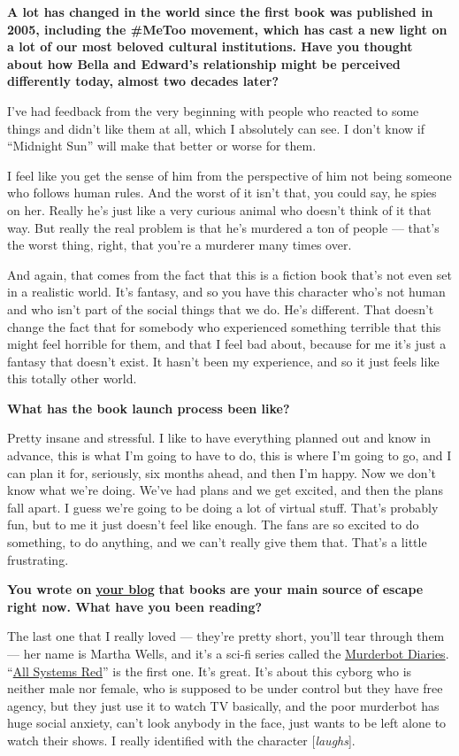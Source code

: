 \textbf{A lot has changed in the world since the first book was
published in 2005, including the \#MeToo movement, which has cast a new
light on a lot of our most beloved cultural institutions. Have you
thought about how Bella and Edward's relationship might be perceived
differently today, almost two decades later?}

I've had feedback from the very beginning with people who reacted to
some things and didn't like them at all, which I absolutely can see. I
don't know if ``Midnight Sun'' will make that better or worse for them.

I feel like you get the sense of him from the perspective of him not
being someone who follows human rules. And the worst of it isn't that,
you could say, he spies on her. Really he's just like a very curious
animal who doesn't think of it that way. But really the real problem is
that he's murdered a ton of people --- that's the worst thing, right,
that you're a murderer many times over.

And again, that comes from the fact that this is a fiction book that's
not even set in a realistic world. It's fantasy, and so you have this
character who's not human and who isn't part of the social things that
we do. He's different. That doesn't change the fact that for somebody
who experienced something terrible that this might feel horrible for
them, and that I feel bad about, because for me it's just a fantasy that
doesn't exist. It hasn't been my experience, and so it just feels like
this totally other world.

\textbf{What has the book launch process been like?}

Pretty insane and stressful. I like to have everything planned out and
know in advance, this is what I'm going to have to do, this is where I'm
going to go, and I can plan it for, seriously, six months ahead, and
then I'm happy. Now we don't know what we're doing. We've had plans and
we get excited, and then the plans fall apart. I guess we're going to be
doing a lot of virtual stuff. That's probably fun, but to me it just
doesn't feel like enough. The fans are so excited to do something, to do
anything, and we can't really give them that. That's a little
frustrating.

\textbf{You wrote on}
\textbf{\href{https://stepheniemeyer.com/updates}{your blog}}
\textbf{that books are your main source of escape right now. What have
you been reading?}

The last one that I really loved --- they're pretty short, you'll tear
through them --- her name is Martha Wells, and it's a sci-fi series
called the
\href{https://www.nytimes3xbfgragh.onion/2020/05/26/books/review/docile-murderbot-otaku-hotspur-shorefall.html}{Murderbot
Diaries}.
``\href{https://www.nytimes3xbfgragh.onion/2018/11/30/books/review/martha-wells-exit-strategy.html}{All
Systems Red}'' is the first one. It's great. It's about this cyborg who
is neither male nor female, who is supposed to be under control but they
have free agency, but they just use it to watch TV basically, and the
poor murderbot has huge social anxiety, can't look anybody in the face,
just wants to be left alone to watch their shows. I really identified
with the character {[}\emph{laughs}{]}.

